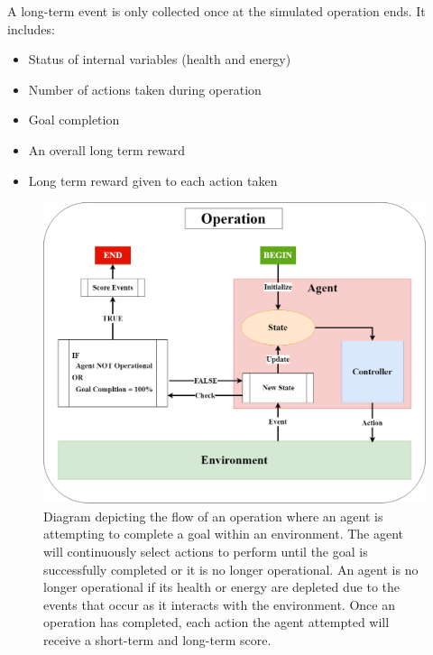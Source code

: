 \noindent
A long-term event is only collected once at the simulated operation ends.
It includes:

\begin{itemize}
  \setlength\itemsep{-12pt}
  \item Status of internal variables (health and energy)
  \item Number of actions taken during operation
  \item Goal completion
  \item An overall long term reward
  \item Long term reward given to each action taken
\end{itemize}

\begin{figure}[!htb]
  \centering
  \includegraphics[width=1.0\columnwidth]{Figures/operation.png}
  \caption[Operation Diagram]{Diagram depicting the flow of an operation where an agent is attempting to complete a goal within an environment. The agent will continuously select actions to perform until the goal is successfully completed or it is no longer operational. An agent is no longer operational if its health or energy are depleted due to the events that occur as it interacts with the environment. Once an operation has completed, each action the agent attempted will receive a short-term and long-term score.}
  \label{fig:operation}
\end{figure}


